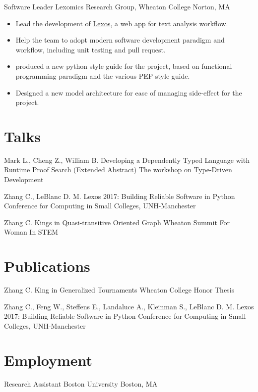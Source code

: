 \documentclass[11pt,a4paper,roman]{moderncv}        %
\begin{document}
{Software Leader}
{Lexomics Research Group, Wheaton College}
{Norton, MA}{}
{
  \begin{itemize}[nosep]
    \item
      Lead the development of \href{https://github.com/WheatonCS/Lexos}{Lexos}, a web app for text analysis workflow.
    \item
      Help the team to adopt modern software development paradigm and workflow,
      including unit testing and pull request.
    \item 
      produced a new python style guide for the project,
      based on functional programming paradigm
      and the various PEP style guide.
    \item
      Designed a new model architecture for ease of managing 
      side-effect for the project.
  \end{itemize}
}


\section{Talks}

{Mark L., Cheng Z., William B.}
{Developing a Dependently Typed Language with Runtime Proof Search (Extended Abstract)}
{The workshop on Type-Driven Development}
{}{}

{Zhang C., LeBlanc D. M.}
{Lexos 2017: Building Reliable Software in Python}
{Conference for Computing in Small Colleges, UNH-Manchester}
{}{}

{Zhang C.}
{Kings in Quasi-transitive Oriented Graph}
{Wheaton Summit For Woman In STEM}
{}{}


\section{Publications}

{Zhang C.}
{King in Generalized Tournaments}
{Wheaton College Honor Thesis}
{}{}

{Zhang C., Feng W., Steffens E., Landaluce A., Kleinman S., LeBlanc D. M.}
{Lexos 2017: Building Reliable Software in Python}
{Conference for Computing in Small Colleges, UNH-Manchester}
{}{}


\section{Employment}

{Research Assistant}
{Boston University}
{Boston, MA}{}
{}
\end{document}
